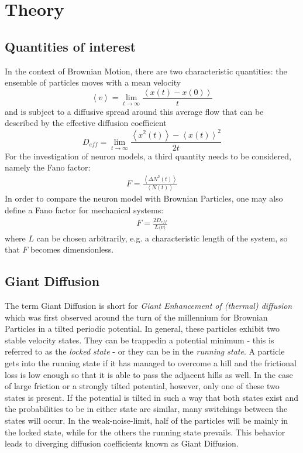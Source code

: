 \documentclass[12pt,a4paper]{article}
\begin{document}
\section{Theory}
\subsection{Quantities of interest}
In the context of Brownian Motion, there are two characteristic quantities: the ensemble of particles moves with a mean velocity
\begin{equation}
\left\langle v\right\rangle =\lim_{t\rightarrow\infty}\frac{\left\langle x(t)-x(0) \right\rangle}{t}
\end{equation}
and is subject to a diffusive spread around this average flow that can be described by the effective diffusion coefficient
\begin{equation}
D_{eff}=\lim_{t\rightarrow\infty}\frac{\left\langle x^2(t) \right\rangle-\left\langle x(t)\right\rangle ^2}{2t}
\end{equation}
For the investigation of neuron models, a third quantity needs to be considered, namely the Fano factor:
\begin{align*}
F=\frac{\left\langle \Delta N^2(t) \right\rangle}{\left\langle N(t)\right\rangle}
\end{align*}
In order to compare the neuron model with Brownian Particles, one may also define a Fano factor for mechanical systems:
\begin{align*}
F=\frac{2D_{eff}}{L\langle v\rangle}
\end{align*}
where $L$ can be chosen arbitrarily, e.g. a characteristic length of the system, so that $F$ becomes dimensionless.
\subsection{Giant Diffusion}
The term \glqq Giant Diffusion \grqq is short for \textit{Giant Enhancement of (thermal) diffusion} which was first observed around the turn of the millennium for Brownian Particles in a tilted periodic potential\cite{td}\cite{ga}\cite{dit}\cite{gd}. In general, these particles exhibit two stable velocity states. They can be \glqq trapped\grqq in a potential minimum - this is referred to as the \textit{locked state} - or they can be in the \textit{running state}. A particle gets into the running state if it has managed to overcome a hill and the frictional loss is low enough so that it is able to pass the adjacent hills as well. In the case of large friction or a strongly tilted potential, however, only one of these two states is present. If the potential is tilted in such a way that both states exist and the probabilities to be in either state are similar, many switchings between the states will occur. In the weak-noise-limit, half of the particles will be mainly in the locked state, while for the others the running state prevails. This behavior leads to diverging diffusion coefficients known as Giant Diffusion.
\end{document}

